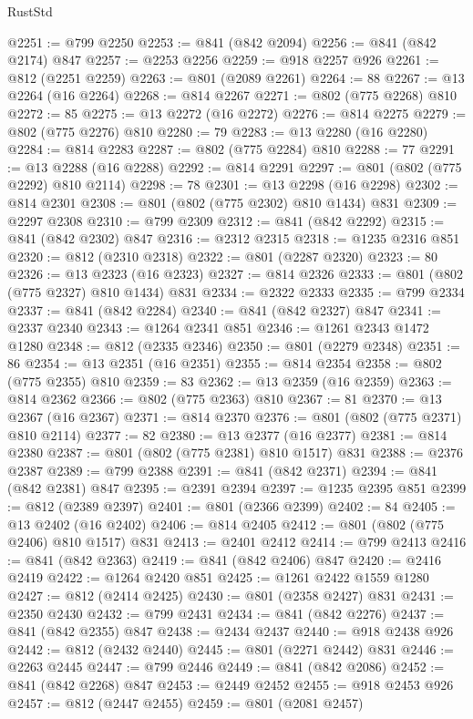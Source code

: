 \begin{lexlean}{RustStd}
\begin{coremodule}
@2251 := @799 @2250
@2253 := @841 (@842 @2094)
@2256 := @841 (@842 @2174) @847
@2257 := @2253 @2256
@2259 := @918 @2257 @926
@2261 := @812 (@2251 @2259)
@2263 := @801 (@2089 @2261)
@2264 := 88
@2267 := @13 @2264 (@16 @2264)
@2268 := @814 @2267
@2271 := @802 (@775 @2268) @810
@2272 := 85
@2275 := @13 @2272 (@16 @2272)
@2276 := @814 @2275
@2279 := @802 (@775 @2276) @810
@2280 := 79
@2283 := @13 @2280 (@16 @2280)
@2284 := @814 @2283
@2287 := @802 (@775 @2284) @810
@2288 := 77
@2291 := @13 @2288 (@16 @2288)
@2292 := @814 @2291
@2297 := @801 (@802 (@775 @2292) @810 @2114)
@2298 := 78
@2301 := @13 @2298 (@16 @2298)
@2302 := @814 @2301
@2308 := @801 (@802 (@775 @2302) @810 @1434) @831
@2309 := @2297 @2308
@2310 := @799 @2309
@2312 := @841 (@842 @2292)
@2315 := @841 (@842 @2302) @847
@2316 := @2312 @2315
@2318 := @1235 @2316 @851
@2320 := @812 (@2310 @2318)
@2322 := @801 (@2287 @2320)
@2323 := 80
@2326 := @13 @2323 (@16 @2323)
@2327 := @814 @2326
@2333 := @801 (@802 (@775 @2327) @810 @1434) @831
@2334 := @2322 @2333
@2335 := @799 @2334
@2337 := @841 (@842 @2284)
@2340 := @841 (@842 @2327) @847
@2341 := @2337 @2340
@2343 := @1264 @2341 @851
@2346 := @1261 @2343 @1472 @1280
@2348 := @812 (@2335 @2346)
@2350 := @801 (@2279 @2348)
@2351 := 86
@2354 := @13 @2351 (@16 @2351)
@2355 := @814 @2354
@2358 := @802 (@775 @2355) @810
@2359 := 83
@2362 := @13 @2359 (@16 @2359)
@2363 := @814 @2362
@2366 := @802 (@775 @2363) @810
@2367 := 81
@2370 := @13 @2367 (@16 @2367)
@2371 := @814 @2370
@2376 := @801 (@802 (@775 @2371) @810 @2114)
@2377 := 82
@2380 := @13 @2377 (@16 @2377)
@2381 := @814 @2380
@2387 := @801 (@802 (@775 @2381) @810 @1517) @831
@2388 := @2376 @2387
@2389 := @799 @2388
@2391 := @841 (@842 @2371)
@2394 := @841 (@842 @2381) @847
@2395 := @2391 @2394
@2397 := @1235 @2395 @851
@2399 := @812 (@2389 @2397)
@2401 := @801 (@2366 @2399)
@2402 := 84
@2405 := @13 @2402 (@16 @2402)
@2406 := @814 @2405
@2412 := @801 (@802 (@775 @2406) @810 @1517) @831
@2413 := @2401 @2412
@2414 := @799 @2413
@2416 := @841 (@842 @2363)
@2419 := @841 (@842 @2406) @847
@2420 := @2416 @2419
@2422 := @1264 @2420 @851
@2425 := @1261 @2422 @1559 @1280
@2427 := @812 (@2414 @2425)
@2430 := @801 (@2358 @2427) @831
@2431 := @2350 @2430
@2432 := @799 @2431
@2434 := @841 (@842 @2276)
@2437 := @841 (@842 @2355) @847
@2438 := @2434 @2437
@2440 := @918 @2438 @926
@2442 := @812 (@2432 @2440)
@2445 := @801 (@2271 @2442) @831
@2446 := @2263 @2445
@2447 := @799 @2446
@2449 := @841 (@842 @2086)
@2452 := @841 (@842 @2268) @847
@2453 := @2449 @2452
@2455 := @918 @2453 @926
@2457 := @812 (@2447 @2455)
@2459 := @801 (@2081 @2457)

\end{coremodule}
\end{lexlean}
